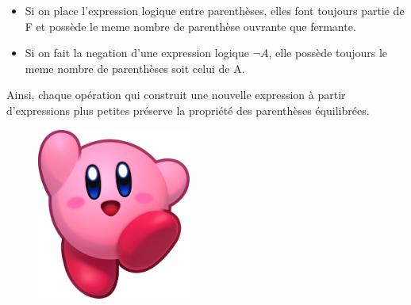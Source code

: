 \documentclass[16pt]{report}
\begin{document}
\begin{multicols*}{2}
\begin{enumerate}
\begin{itemize}
        \item Si on place l'expression logique entre parenthèses, elles font toujours partie de F et possède le meme nombre de parenthèse ouvrante que fermante. \\

        \item Si on fait la negation d'une expression logique $\lnot A$, elle possède toujours le meme nombre de parenthèses soit celui de A. \\
        \end{itemize}

        Ainsi, chaque opération qui construit une nouvelle expression à partir d'expressions plus petites préserve la propriété des parenthèses équilibrées.
        \end{enumerate}

        \begin{figure}[H]
            \begin{center}
                \includegraphics[width=0.45\textwidth]{Kirby.png}
            \end{center}
        \end{figure}
        
        \end{multicols*}  
\end{document}
